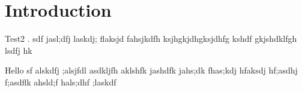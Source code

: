 \documentclass[12pt]{article}
\begin{document}
\section{Introduction}
Test2 \cite{originalNEAT}. sdf jasl;dfj laskdj; 
flaksjd fahsjkdfh ksjhgkjdhgksjdhfg kshdf gkjshdklfgh
 lsdfj hk

Hello sf alskdfj ;alsjfdl asdkljfh aklshfk jashdfk jahs;dk fhas;kdj hfaksdj hf;asdhj f;asdflk ahsld;f hals;dhf ;laskdf 



\end{document}
